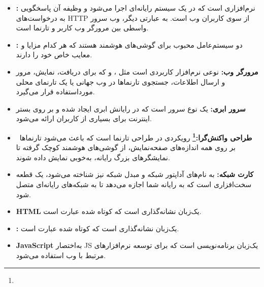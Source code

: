 \documentclass[12pt,a4paper,oneside]{article}
\begin{document}
\begin{itemize}
					  \item 
					  \textbf{:\label{ref:webserver}} 
					  نرم‌افزاری است که در یک سیستم رایانه‌ای اجرا می‌شود و وظیفه آن پاسخگویی به درخواست‌های HTTP از سوی کاربران وب است. به عبارتی دیگر، وب سرور واسطی بین مرورگر وب کاربر و تارنما است.
					  
					    \item 
					  \textbf{: \label{ref:androidios}}
					  دو سیستم‌عامل محبوب برای گوشی‌های هوشمند هستند که هر کدام مزایا و معایب خاص خود را دارند.

					  \item 
					  \textbf{مرورگر وب:\label{ref:browser}}
					   نوعی نرم‌افزار کاربردی است مثل 
					    ، و 
						که برای دریافت، نمایش، مرور و ارسال اطلاعات، جستجوی تارنماها در وب جهانی یا یک تارنمای محلی مورداستفاده قرار می‌گیرد.
						
						\item 
					  \textbf{سرور ابری:\label{ref:cloudserver}}
					   یک نوع سرور است که در رایانش ابری ایجاد شده و بر روی بستر اینترنت برای بسیاری از کاربران ارائه می‌شود. 
					   
					   \item 
					    \textbf{طراحی واکنش‌گرا:\footnote{}\label{ref:responsivedesign}} رویکردی در طراحی تارنما است که باعث می‌شود تارنماها بر روی همه اندازه‌های صفحه‌نمایش، از گوشی‌های هوشمند کوچک گرفته تا نمایشگرهای بزرگ رایانه، به‌خوبی نمایش داده شوند.

						\item
					  \textbf{ کارت شبکه:\label{ref:networkcard}}
						به نام‌های آداپتور شبکه و مبدل شبکه نیز شناخته می‌شود، یک قطعه سخت‌افزاری است که به رایانه شما اجازه می‌دهد تا به شبکه‌های رایانه‌ای متصل شود.

						\item
					   \textbf{HTML\rl{:}\label{ref:html}}
					   یک‌زبان نشانه‌گذاری است که کوتاه شده عبارت
					     است.
					     
					   \item
					   \textbf{:\label{ref:css}}
					    یک‌زبان نشانه‌گذاری است که کوتاه شده عبارت
					      است.
					      
					   \item
					   \textbf{JavaScript\rl{:}\label{ref:js}}
به‌اختصار JS یک‌زبان برنامه‌نویسی است که برای توسعه نرم‌افزارهای مرتبط با وب استفاده می‌شود.
					    

\end{itemize}
\end{document}
